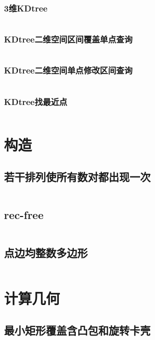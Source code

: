 \documentclass{article}
\begin{document}
\subsubsection{3维KDtree}
\inputminted[breaklines]{c++}{../数据结构/3维KDtree.cpp}

\subsubsection{KDtree二维空间区间覆盖单点查询}
\inputminted[breaklines]{c++}{../数据结构/KDtree二维空间区间覆盖单点查询.cpp}

\subsubsection{KDtree二维空间单点修改区间查询}
\inputminted[breaklines]{c++}{../数据结构/KDtree二维空间单点修改区间查询.cpp}

\subsubsection{KDtree找最近点}
\inputminted[breaklines]{c++}{../数据结构/KDtree找最近点.cpp}

\newpage
\section{构造}
\subsection{若干排列使所有数对都出现一次}
\inputminted[breaklines]{c++}{../构造/若干排列使所有数对都出现一次.cpp}

\subsection{rec-free}
\inputminted[breaklines]{c++}{../构造/rec-free.cpp}

\subsection{点边均整数多边形}
\inputminted[breaklines]{c++}{../构造/点边均整数多边形.cpp}

\newpage
\section{计算几何}
\subsection{最小矩形覆盖含凸包和旋转卡壳}
\inputminted[breaklines]{c++}{../计算几何/最小矩形覆盖含凸包和旋转卡壳.cpp}
\end{document}

